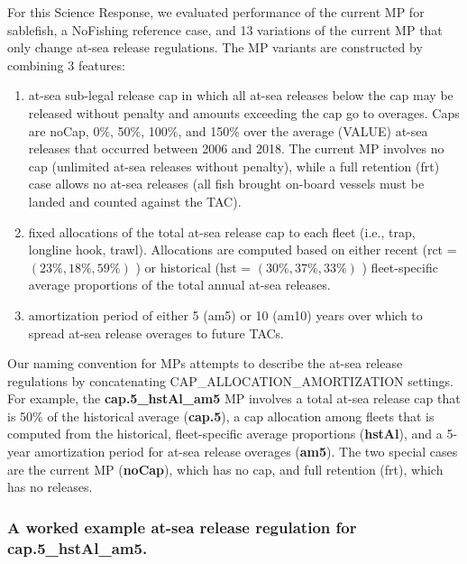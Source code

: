 \documentclass[11pt]{book}
\begin{document}
For this Science Response, we evaluated performance of the current MP for sablefish, a NoFishing reference case, and 13 variations of the current MP that only change at-sea release regulations. The MP variants are constructed by combining 3 features:
\begin{enumerate}
\def\labelenumi{\arabic{enumi}.}

\item
  at-sea sub-legal release cap in which all at-sea releases below the cap may be released without penalty and amounts exceeding the cap go to overages. Caps are noCap, 0\%, 50\%, 100\%, and 150\% over the average (VALUE) at-sea releases that occurred between 2006 and 2018. The current MP involves no cap (unlimited at-sea releases without penalty), while a full retention (frt) case allows no at-sea releases (all fish brought on-board vessels must be landed and counted against the TAC).
\item
  fixed allocations of the total at-sea release cap to each fleet (i.e., trap, longline hook, trawl). Allocations are computed based on either recent (rct = \((23\%, 18\%, 59\%)\) ) or historical (hst = \((30\%, 37\%, 33\%)\) ) fleet-specific average proportions of the total annual at-sea releases.
\item
  amortization period of either 5 (am5) or 10 (am10) years over which to spread at-sea release overages to future TACs.
\end{enumerate}
Our naming convention for MPs attempts to describe the at-sea release regulations by concatenating CAP\_ALLOCATION\_AMORTIZATION settings. For example, the \textbf{cap.5\_hstAl\_am5} MP involves a total at-sea release cap that is 50\% of the historical average (\textbf{cap.5}), a cap allocation among fleets that is computed from the historical, fleet-specific average proportions (\textbf{hstAl}), and a 5-year amortization period for at-sea release overages (\textbf{am5}). The two special cases are the current MP (\textbf{noCap}), which has no cap, and full retention (frt), which has no releases.

\hypertarget{a-worked-example-at-sea-release-regulation-for-cap.5_hstal_am5.}{%
\subsubsection{\texorpdfstring{A worked example at-sea release regulation for \textbf{cap.5\_hstAl\_am5}.}{A worked example at-sea release regulation for cap.5\_hstAl\_am5.}}\label{a-worked-example-at-sea-release-regulation-for-cap.5_hstal_am5.}}
\end{document}
